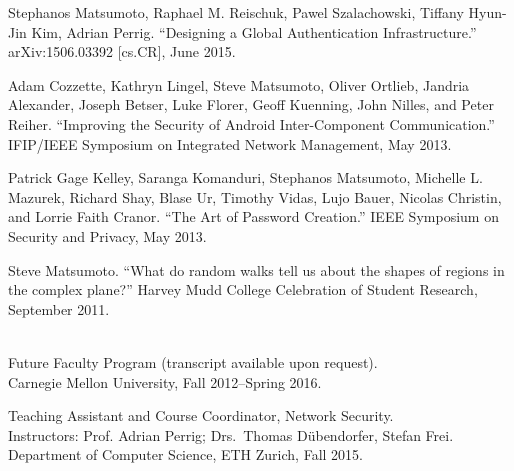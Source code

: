 \documentclass[11pt]{article}
\begin{document}
\renewcommand{\refname}{Preprints}
\begin{thebibliography}{77}
  Stephanos Matsumoto, Raphael M. Reischuk, Pawel Szalachowski, Tiffany Hyun-Jin
  Kim, Adrian Perrig.
\newblock ``Designing a Global Authentication Infrastructure.''
\newblock arXiv:1506.03392 [cs.CR], June 2015.
\end{thebibliography}

\renewcommand{\refname}{Posters}
\begin{thebibliography}{77}
Adam Cozzette, Kathryn Lingel, Steve Matsumoto, Oliver Ortlieb, Jandria
Alexander, Joseph Betser, Luke Florer, Geoff Kuenning, John Nilles, and Peter
Reiher.
\newblock ``Improving the Security of Android Inter-Component Communication.''
\newblock IFIP/IEEE Symposium on Integrated
Network Management, May 2013.\\

Patrick Gage Kelley, Saranga Komanduri, Stephanos Matsumoto, Michelle L.
Mazurek, Richard Shay, Blase Ur, Timothy Vidas, Lujo Bauer, Nicolas Christin,
and Lorrie Faith Cranor.
\newblock ``The Art of Password Creation.''
\newblock IEEE Symposium on Security and Privacy, May 2013.\\

Steve Matsumoto.
\newblock ``What do random walks tell us about the shapes of regions in the
complex plane?''
\newblock Harvey Mudd College Celebration of Student Research, September 2011.\\
\end{thebibliography}

{}\\

\noindent Future Faculty Program (transcript available upon request).\\
Carnegie Mellon University, Fall 2012--Spring 2016.
\vspace{2mm}

\noindent Teaching Assistant and Course Coordinator, Network Security.\\
Instructors: Prof. Adrian Perrig; Drs.\ Thomas D\"{u}bendorfer, Stefan Frei.\\
Department of Computer Science, ETH Zurich, Fall 2015.
\vspace{2mm}
\end{document}
